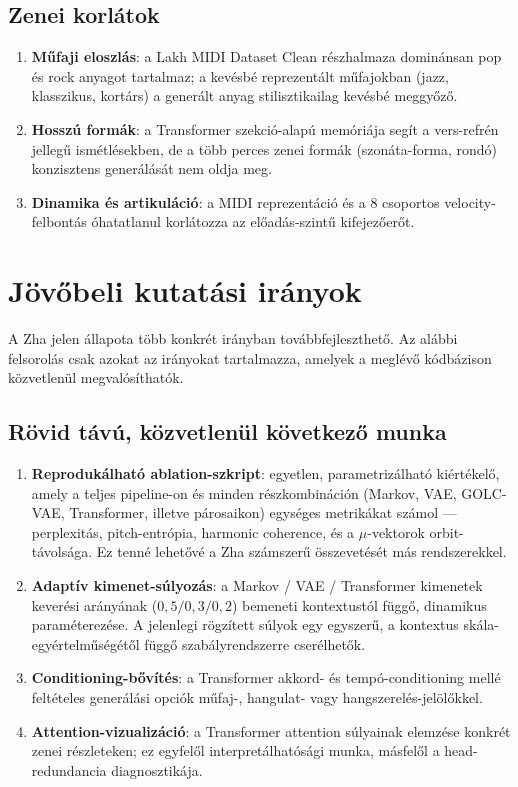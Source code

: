 \subsection{Zenei korlátok}

\begin{enumerate}
  \item \textbf{Műfaji eloszlás}: a Lakh MIDI Dataset Clean részhalmaza dominánsan pop és rock anyagot tartalmaz; a kevésbé reprezentált műfajokban (jazz, klasszikus, kortárs) a generált anyag stilisztikailag kevésbé meggyőző.

  \item \textbf{Hosszú formák}: a Transformer szekció-alapú memóriája segít a vers-refrén jellegű ismétlésekben, de a több perces zenei formák (szonáta-forma, rondó) konzisztens generálását nem oldja meg.

  \item \textbf{Dinamika és artikuláció}: a MIDI reprezentáció és a 8 csoportos velocity-felbontás óhatatlanul korlátozza az előadás-szintű kifejezőerőt.
\end{enumerate}

\section{Jövőbeli kutatási irányok}

A Zha jelen állapota több konkrét irányban továbbfejleszthető. Az alábbi felsorolás csak azokat az irányokat tartalmazza, amelyek a meglévő kódbázison közvetlenül megvalósíthatók.

\subsection{Rövid távú, közvetlenül következő munka}

\begin{enumerate}
  \item \textbf{Reprodukálható ablation-szkript}: egyetlen, parametrizálható kiértékelő, amely a teljes pipeline-on és minden részkombináción (Markov, VAE, GOLC-VAE, Transformer, illetve párosaikon) egységes metrikákat számol --- perplexitás, pitch-entrópia, harmonic coherence, és a $\mu$-vektorok orbit-távolsága. Ez tenné lehetővé a Zha számszerű összevetését más rendszerekkel.

  \item \textbf{Adaptív kimenet-súlyozás}: a Markov / VAE / Transformer kimenetek keverési arányának ($0{,}5 / 0{,}3 / 0{,}2$) bemeneti kontextustól függő, dinamikus paraméterezése. A jelenlegi rögzített súlyok egy egyszerű, a kontextus skála-egyértelműségétől függő szabályrendszerre cserélhetők.

  \item \textbf{Conditioning-bővítés}: a Transformer akkord- és tempó-conditioning mellé feltételes generálási opciók műfaj-, hangulat- vagy hangszerelés-jelölőkkel.

  \item \textbf{Attention-vizualizáció}: a Transformer attention súlyainak elemzése konkrét zenei részleteken; ez egyfelől interpretálhatósági munka, másfelől a head-redundancia diagnosztikája.
\end{enumerate}

